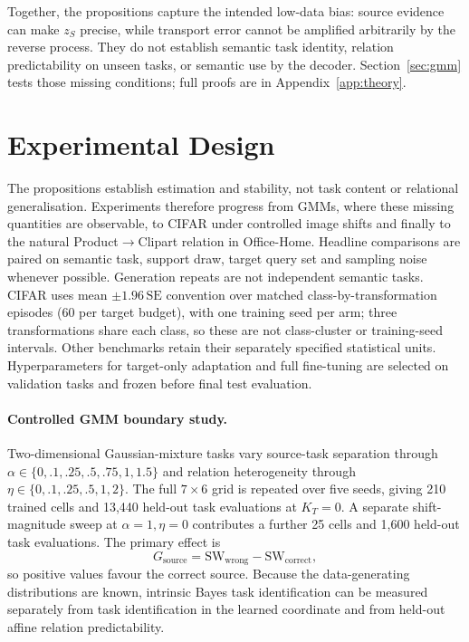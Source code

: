 \documentclass{article}
\newcommand{\KT}{K_T}
\begin{document}
Together, the propositions capture the intended low-data bias: source evidence can make $z_S$ precise, while transport error cannot be amplified arbitrarily by the reverse process. They do not establish semantic task identity, relation predictability on unseen tasks, or semantic use by the decoder. Section~\ref{sec:gmm} tests those missing conditions; full proofs are in Appendix~\ref{app:theory}.

\section{Experimental Design}
\label{sec:experiments}
The propositions establish estimation and stability, not task content or relational generalisation. Experiments therefore progress from GMMs, where these missing quantities are observable, to CIFAR under controlled image shifts and finally to the natural Product$\rightarrow$Clipart relation in Office-Home. Headline comparisons are paired on semantic task, support draw, target query set and sampling noise whenever possible. Generation repeats are not independent semantic tasks. CIFAR uses mean $\pm1.96\,\mathrm{SE}$ convention over matched class-by-transformation episodes (60 per target budget), with one training seed per arm; three transformations share each class, so these are not class-cluster or training-seed intervals. Other benchmarks retain their separately specified statistical units. Hyperparameters for target-only adaptation and full fine-tuning are selected on validation tasks and frozen before final test evaluation.

\paragraph{Controlled GMM boundary study.}
Two-dimensional Gaussian-mixture tasks vary source-task separation through $\alpha\in\{0,.1,.25,.5,.75,1,1.5\}$ and relation heterogeneity through $\eta\in\{0,.1,.25,.5,1,2\}$. The full $7\times6$ grid is repeated over five seeds, giving 210 trained cells and 13,440 held-out task evaluations at $\KT=0$. A separate shift-magnitude sweep at $\alpha=1,\eta=0$ contributes a further 25 cells and 1{,}600 held-out task evaluations. The primary effect is
\[
G_{\mathrm{source}}=\mathrm{SW}_{\mathrm{wrong}}-\mathrm{SW}_{\mathrm{correct}},
\]
so positive values favour the correct source. Because the data-generating distributions are known, intrinsic Bayes task identification can be measured separately from task identification in the learned coordinate and from held-out affine relation predictability.
\end{document}
